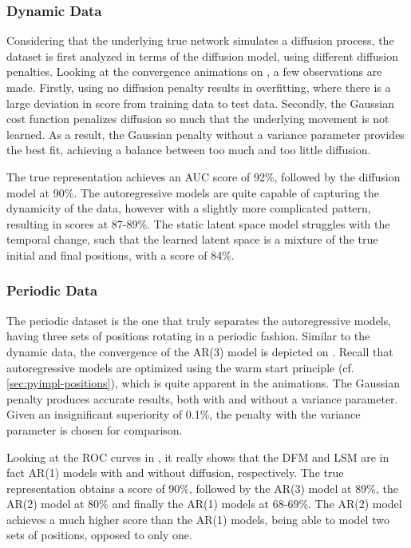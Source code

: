         \subsubsection{Dynamic Data}
        
            Considering that the underlying true network simulates a diffusion process, the dataset is first analyzed in terms of the diffusion model, using different diffusion penalties. Looking at the convergence animations on , a few observations are made. Firstly, using no diffusion penalty results in overfitting, where there is a large deviation in score from training data to test data. Secondly, the Gaussian cost function penalizes diffusion so much that the underlying movement is not learned. As a result, the Gaussian penalty without a variance parameter provides the best fit, achieving a balance between too much and too little diffusion.
            
            The true representation achieves an AUC score of 92\%, followed by the diffusion model at 90\%. The autoregressive models are quite capable of capturing the dynamicity of the data, however with a slightly more complicated pattern, resulting in scores at 87-89\%. The static latent space model struggles with the temporal change, such that the learned latent space is a mixture of the true initial and final positions, with a score of 84\%. 
        
        \subsubsection{Periodic Data}
        
            The periodic dataset is the one that truly separates the autoregressive models, having three sets of positions rotating in a periodic fashion. Similar to the dynamic data, the convergence of the AR(3) model is depicted on . Recall that autoregressive models are optimized using the warm start principle (cf. \cref{sec:pyimpl-positions}), which is quite apparent in the animations. The Gaussian penalty produces accurate results, both with and without a variance parameter. Given an insignificant superiority of 0.1\%, the penalty with the variance parameter is chosen for comparison.
            
            Looking at the ROC curves in , it really shows that the DFM and LSM are in fact AR(1) models with and without diffusion, respectively. The true representation obtains a score of 90\%, followed by the AR(3) model at 89\%, the AR(2) model at 80\% and finally the AR(1) models at 68-69\%. The AR(2) model achieves a much higher score than the AR(1) models, being able to model two sets of positions, opposed to only one.
        

